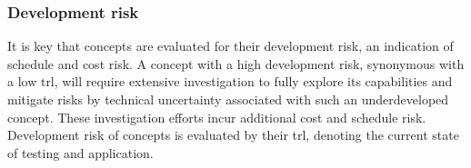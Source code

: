\subsubsection{Development risk}
It is key that concepts are evaluated for their development risk, an indication of schedule and cost risk. A concept with a high development risk, synonymous with a low \acrfull{trl}, will require extensive investigation to fully explore its capabilities and mitigate risks by technical uncertainty associated with such an underdeveloped concept. These investigation efforts incur additional cost and schedule risk. Development risk of concepts is evaluated by their \gls{trl}, denoting the current state of testing and application.



